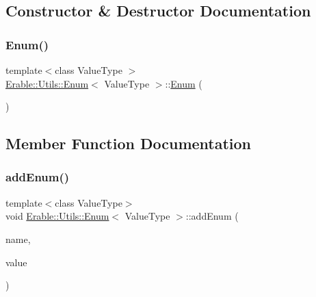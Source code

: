 \subsection{Constructor \& Destructor Documentation}
\mbox{\label{class_erable_1_1_utils_1_1_enum_aa3151a7333ce05cc5767c76634330da7}} 
\subsubsection{\texorpdfstring{Enum()}{Enum()}}
{\footnotesize\ttfamily template$<$class Value\+Type $>$ \\
\mbox{\hyperlink{class_erable_1_1_utils_1_1_enum}{Erable\+::\+Utils\+::\+Enum}}$<$ Value\+Type $>$\+::\mbox{\hyperlink{class_erable_1_1_utils_1_1_enum}{Enum}} (\begin{DoxyParamCaption}{ }\end{DoxyParamCaption})\hspace{0.3cm}{\ttfamily [default]}}



\subsection{Member Function Documentation}
\mbox{\label{class_erable_1_1_utils_1_1_enum_ae00f52dd3ee8b9e106119c1262c5a88b}} 
\subsubsection{\texorpdfstring{addEnum()}{addEnum()}\hspace{0.1cm}{\footnotesize\ttfamily [1/2]}}
{\footnotesize\ttfamily template$<$class Value\+Type$>$ \\
void \mbox{\hyperlink{class_erable_1_1_utils_1_1_enum}{Erable\+::\+Utils\+::\+Enum}}$<$ Value\+Type $>$\+::add\+Enum (\begin{DoxyParamCaption}\item[{std\+::string}]{name,  }\item[{Value\+Type}]{value }\end{DoxyParamCaption})\hspace{0.3cm}{\ttfamily [inline]}}

